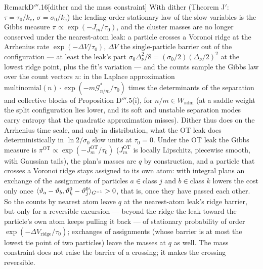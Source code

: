 \begin{rmk}{Remark}{D$'''$.16}[dither and the mass constraint]
With dither (Theorem J$'$: $\tau = \tau_0/k_e$, $\sigma = \sigma_0/k_e$) the leading-order stationary law of the slow
variables is the Gibbs measure $\pi\propto\exp(-J_m/\tau_0)$, and the cluster masses are no longer conserved under
the nearest-atom leak: a particle crosses a Voronoi ridge at the Arrhenius rate $\exp(-\Delta V/\tau_0)$, $\Delta V$
the single-particle barrier out of the configuration --- at least the leak's part
$\sigma_0\Delta_\nu^2/8 = (\sigma_0/2)(\Delta_\nu/2)^2$ at the lowest ridge point, plus the fit's variation --- and
the counts sample the Gibbs law over the count vectors $n$: in the Laplace approximation
$\mathrm{multinomial}(n)\cdot\exp(-m\mathcal{G}^*_{n/m}/\tau_0)$ times the determinants of the separation and
collective blocks of Proposition D$'''$.5(i), for $n/m\in W_{\mathrm{adm}}$ (at a saddle weight the split
configuration lies lower, and its soft and unstable separation modes carry entropy that the quadratic approximation
misses). Dither thus does on the Arrhenius time scale, and only in distribution, what the OT leak does
deterministically in $\ln2/\sigma_0$ slow units at $\tau_0 = 0$. Under the OT leak the Gibbs measure is
$\pi^{\mathrm{OT}}\propto\exp(-J_m^{\mathrm{OT}}/\tau_0)$ ($J_m^{\mathrm{OT}}$ is locally Lipschitz, piecewise smooth,
with Gaussian tails), the plan's masses are $q$ by construction, and a particle that crosses a Voronoi ridge stays
assigned to its own atom: with integral plans an exchange of the assignments of particles $a\in{}$class $j$ and
$b\in{}$class $k$ lowers the cost only once
$\langle\vartheta_a - \vartheta_b,\vartheta^0_k - \vartheta^0_j\rangle_{G^{-1}} > 0$, that is, once they have passed
each other. So the counts by nearest atom leave $q$ at the nearest-atom leak's ridge barrier, but only for a
reversible excursion --- beyond the ridge the leak toward the particle's own atom keeps pulling it back --- of
stationary probability of order $\exp(-\Delta V_{\mathrm{ridge}}/\tau_0)$; exchanges of assignments (whose barrier is
at most the lowest tie point of two particles) leave the masses at $q$ as well. The mass constraint does not raise
the barrier of a crossing; it makes the crossing reversible.
\end{rmk}

